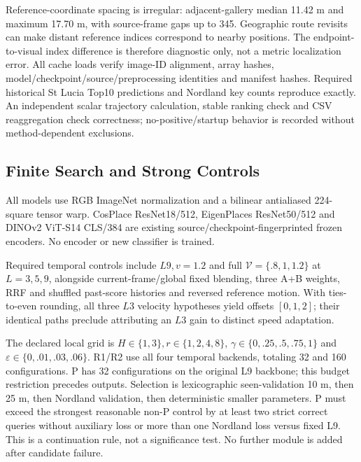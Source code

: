 \documentclass[conference]{IEEEtran}
\begin{document}
Reference-coordinate spacing is irregular: adjacent-gallery median 11.42 m and maximum 17.70 m, with source-frame gaps up to 345. Geographic route revisits can make distant reference indices correspond to nearby positions. The endpoint-to-visual index difference is therefore diagnostic only, not a metric localization error. All cache loads verify image-ID alignment, array hashes, model/checkpoint/source/preprocessing identities and manifest hashes. Required historical St Lucia Top10 predictions and Nordland key counts reproduce exactly. An independent scalar trajectory calculation, stable ranking check and CSV reaggregation check correctness; no-positive/startup behavior is recorded without method-dependent exclusions.

\subsection{Finite Search and Strong Controls}
All models use RGB ImageNet normalization and a bilinear antialiased 224-square tensor warp. CosPlace ResNet18/512, EigenPlaces ResNet50/512 and DINOv2 ViT-S14 CLS/384 are existing source/checkpoint-fingerprinted frozen encoders. No encoder or new classifier is trained.

Required temporal controls include $L9,v=1.2$ and full $\mathcal V=\{.8,1,1.2\}$ at $L=3,5,9$, alongside current-frame/global fixed blending, three A+B weights, RRF and shuffled past-score histories and reversed reference motion. With ties-to-even rounding, all three $L3$ velocity hypotheses yield offsets $[0,1,2]$; their identical paths preclude attributing an $L3$ gain to distinct speed adaptation.

The declared local grid is $H\in\{1,3\},r\in\{1,2,4,8\}$, $\gamma\in\{0,.25,.5,.75,1\}$ and $\varepsilon\in\{0,.01,.03,.06\}$. R1/R2 use all four temporal backends, totaling 32 and 160 configurations. P has 32 configurations on the original L9 backbone; this budget restriction precedes outputs. Selection is lexicographic seen-validation 10 m, then 25 m, then Nordland validation, then deterministic smaller parameters. P must exceed the strongest reasonable non-P control by at least two strict correct queries without auxiliary loss or more than one Nordland loss versus fixed L9. This is a continuation rule, not a significance test. No further module is added after candidate failure.
\end{document}

